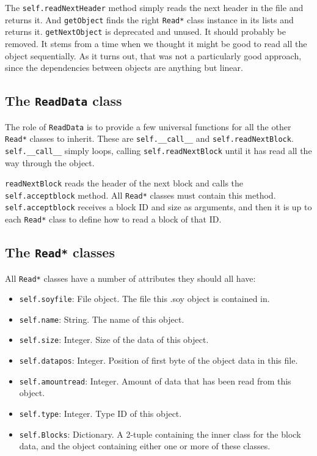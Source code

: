 The \texttt{self.readNextHeader} method simply reads the next header in the file and returns it. And \texttt{getObject} finds the right \texttt{Read*} class instance in its lists and returns it. \texttt{getNextObject} is deprecated and unused. It should probably be removed. It stems from a time when we thought it might be good to read all the object sequentially. As it turns out, that was not a particularly good approach, since the dependencies between objects are anything but linear.

\subsection*{The \texttt{ReadData} class}
The role of \texttt{ReadData} is to provide a few universal functions for all the other \texttt{Read*} classes to inherit. These are \texttt{self.\_\_call\_\_} and \texttt{self.readNextBlock}. \texttt{self.\_\_call\_\_} simply loops, calling \texttt{self.readNextBlock} until it has read all the way through the object.

\texttt{readNextBlock} reads the header of the next block and calls the \\ \texttt{self.acceptblock} method. All \texttt{Read*} classes must contain this method. \\ \texttt{self.acceptblock} receives a block ID and size as arguments, and then it is up to each \texttt{Read*} class to define how to read a block of that ID.

\subsection*{The \texttt{Read*} classes}

All \texttt{Read*} classes have a number of attributes they should all have:
\begin{itemize}
\item \texttt{self.soyfile}: File object. The file this .soy object is contained in.
\item \texttt{self.name}: String. The name of this object.
\item \texttt{self.size}: Integer. Size of the data of this object.
\item \texttt{self.datapos}: Integer. Position of first byte of the object data in this file.
\item \texttt{self.amountread}: Integer. Amount of data that has been read from this object.
\item \texttt{self.type}: Integer. Type ID of this object.
\item \texttt{self.Blocks}: Dictionary. A 2-tuple containing the inner class for the block data, and the object containing either one or more of these classes.
\end{itemize}

